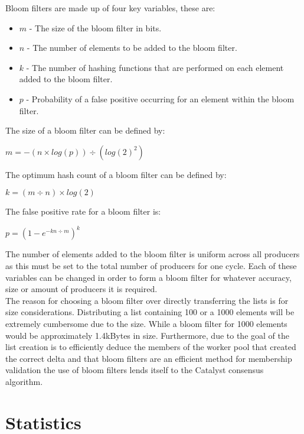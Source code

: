 \documentclass{article}
\begin{document}
Bloom filters are made up of four key variables, these are:

\begin{itemize} 
\item $m$ - The size of the bloom filter in bits.  
\item $n$ - The number of elements to be added to the bloom filter. 
\item $k$ - The number of hashing functions that are performed on each element added to the bloom filter. 
\item $p$ - Probability of a false positive occurring for an element within the bloom filter. 
\end{itemize} 

The size of a bloom filter can be defined by: 

\begin{center} 
$m = -(n \times log(p)) \div (log(2)^2)$
\end{center} 

The optimum hash count of a bloom filter can be defined by:

\begin{center} 
$k = (m \div n) \times log(2)$
\end{center} 

The false positive rate for a bloom filter is: 

\begin{center} 
$p = (1 - e^{-kn \div m})^k$
\end{center} 

The number of elements added to the bloom filter is uniform across all producers as this must be set to the total number of producers for one cycle. Each of these variables can be changed in order to form a bloom filter for whatever accuracy, size or amount of producers it is required.\\

The reason for choosing a bloom filter over directly transferring the lists is for size considerations. Distributing a list containing 100 or a 1000 elements will be extremely cumbersome due to the size. While a bloom filter for 1000 elements would be approximately 1.4kBytes in size. Furthermore, due to the goal of the list creation is to efficiently deduce the members of the worker pool that created the correct delta and that bloom filters are an efficient method for membership validation the use of bloom filters lends itself to the Catalyst consensus algorithm. 

\section{Statistics}
\end{document}
